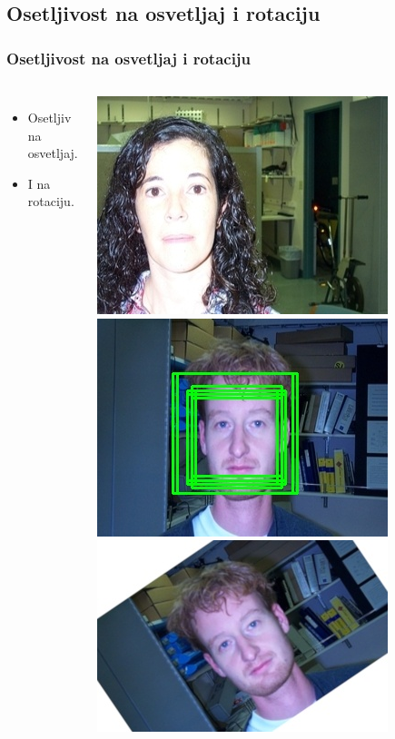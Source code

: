 \documentclass{beamer}
\begin{document}
\subsection{Osetljivost na osvetljaj i rotaciju}
\begin{frame}
  \frametitle{Osetljivost na osvetljaj i rotaciju}

  \begin{columns}[onlytextwidth,T]
    \column{\dimexpr\linewidth-50mm-2mm}
    \begin{itemize}
    \item<1-> Osetljiv na osvetljaj.
    \item<2-> I na rotaciju.
    \end{itemize}


    \column{80mm}
    \begin{overprint}
      \includegraphics[width=0.7\linewidth]{../images/overexposed_light}
      \includegraphics[width=0.7\linewidth]{../images/rotation_variance}
      \includegraphics[width=0.7\linewidth]{../images/rotated_res}
    \end{overprint}

  \end{columns}
\end{frame}
\end{document}
